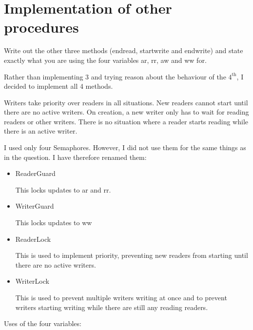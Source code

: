 \documentclass[10pt,\jkfside,a4paper]{article}
\begin{document}
\section{Implementation of other procedures}

Write out the other three methods (endread, startwrite and endwrite) and
state exactly what you are using the four variables ar, rr, aw and ww for.

Rather than implementing 3 and trying reason about the behaviour of the
$4^{\text{th}}$, I decided to implement all 4 methods.

Writers take priority over readers in all situations. New readers cannot start
until there are no active writers. On creation, a new writer only has to
wait for reading readers or other writers. There is no situation where a
reader starts reading while there is an active writer.

I used only four Semaphores. However, I did not use them for the same
things as in the question. I have therefore renamed them:

\begin{itemize}

\item ReaderGuard

This locks updates to ar and rr.

\item WriterGuard

This locks updates to ww

\item ReaderLock

This is used to implement priority, preventing new readers from starting
until there are no active writers.

\item WriterLock

This is used to prevent multiple writers writing at once and to prevent
writers starting writing while there are still any reading readers.

\end{itemize}

Uses of the four variables:
\end{document}
